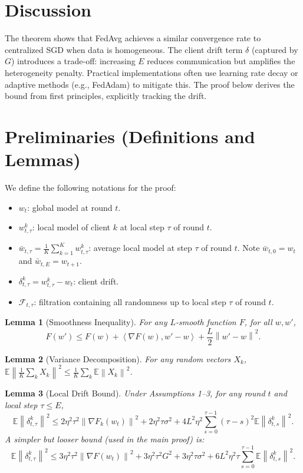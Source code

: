 \documentclass{article}
\newtheorem{lemma}{Lemma}
\newcommand{\norm}[1]{\left\| #1 \right\|}
\newcommand{\inner}[2]{\left\langle #1, #2 \right\rangle}
\begin{document}
\section*{Discussion}
The theorem shows that FedAvg achieves a similar convergence rate to centralized SGD when data is homogeneous. The client drift term $\delta$ (captured by $G$) introduces a trade-off: increasing $E$ reduces communication but amplifies the heterogeneity penalty. Practical implementations often use learning rate decay or adaptive methods (e.g., FedAdam) to mitigate this. The proof below derives the bound from first principles, explicitly tracking the drift.

\section*{Preliminaries (Definitions and Lemmas)}
We define the following notations for the proof:
\begin{itemize}
    \item $w_t$: global model at round $t$.
    \item $w_{t,\tau}^k$: local model of client $k$ at local step $\tau$ of round $t$.
    \item $\bar{w}_{t,\tau} = \frac{1}{K}\sum_{k=1}^K w_{t,\tau}^k$: average local model at step $\tau$ of round $t$. Note $\bar{w}_{t,0} = w_t$ and $\bar{w}_{t,E} = w_{t+1}$.
    \item $\delta_{t,\tau}^k = w_{t,\tau}^k - w_t$: client drift.
    \item $\mathcal{F}_{t,\tau}$: filtration containing all randomness up to local step $\tau$ of round $t$.
\end{itemize}

\begin{lemma}[Smoothness Inequality]
For any $L$-smooth function $F$, for all $w, w'$,
\begin{equation}
    F(w') \le F(w) + \inner{\nabla F(w)}{w' - w} + \frac{L}{2} \norm{w' - w}^2.
\end{equation}
\end{lemma}

\begin{lemma}[Variance Decomposition]
For any random vectors $X_k$, $\mathbb{E}\norm{\frac{1}{K}\sum_k X_k}^2 \le \frac{1}{K}\sum_k \mathbb{E}\norm{X_k}^2$.
\end{lemma}

\begin{lemma}[Local Drift Bound]
Under Assumptions 1--3, for any round $t$ and local step $\tau \le E$,
\begin{equation}
    \mathbb{E} \norm{\delta_{t,\tau}^k}^2 \le 2\eta^2 \tau^2 \norm{\nabla F_k(w_t)}^2 + 2\eta^2 \tau \sigma^2 + 4L^2 \eta^2 \sum_{s=0}^{\tau-1} (\tau-s)^2 \mathbb{E}\norm{\delta_{t,s}^k}^2.
\end{equation}
A simpler but looser bound (used in the main proof) is:
\begin{equation}
    \mathbb{E} \norm{\delta_{t,\tau}^k}^2 \le 3\eta^2 \tau^2 \norm{\nabla F(w_t)}^2 + 3\eta^2 \tau^2 G^2 + 3\eta^2 \tau \sigma^2 + 6L^2 \eta^2 \tau \sum_{s=0}^{\tau-1} \mathbb{E}\norm{\delta_{t,s}^k}^2.
\end{equation}
\end{lemma}
\end{document}

